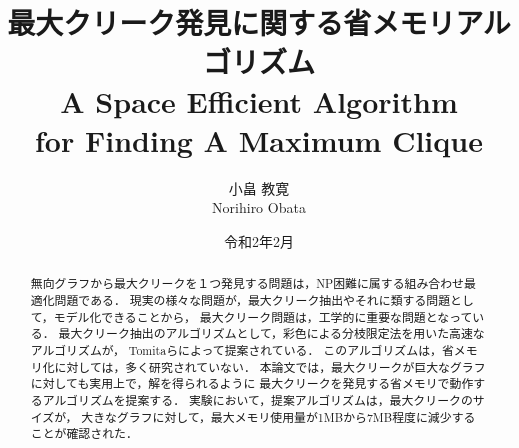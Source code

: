 \documentclass[12pt , twoside]{jsotsuron}
\title{ 最大クリーク発見に関する省メモリアルゴリズム\\
 A Space Efficient Algorithm\\ for Finding A Maximum Clique}
\author{小畠 教寛\\ Norihiro Obata}
\date{令和2年2月}
\theoremstyle{definition}
\begin{document}
\maketitle

\begin{abstract}
無向グラフから最大クリークを１つ発見する問題は，NP困難に属する組み合わせ最適化問題である．
現実の様々な問題が，最大クリーク抽出やそれに類する問題として，モデル化できることから，
最大クリーク問題は，工学的に重要な問題となっている．
最大クリーク抽出のアルゴリズムとして，彩色による分枝限定法を用いた高速なアルゴリズムが，
Tomitaらによって提案されている．
%
このアルゴリズムは，省メモリ化に対しては，多く研究されていない．
%
本論文では，最大クリークが巨大なグラフに対しても実用上で，解を得られるように
最大クリークを発見する省メモリで動作するアルゴリズムを提案する．
実験において，提案アルゴリズムは，最大クリークのサイズが，
大きなグラフに対して，最大メモリ使用量が1MBから7MB程度に減少することが確認された．

\end{abstract}
\newpage
\tableofcontents
\newpage











\end{document}
